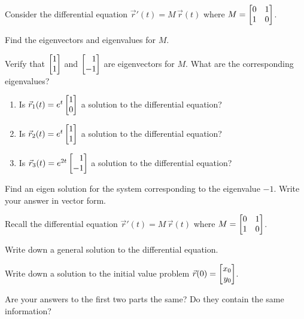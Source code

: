 \documentclass{workbook}
\begin{document}
\begin{slide}
	\question
	Consider the differential equation $\vec r'(t) = M\,\vec r(t)$ where $M=\mat{0&1\\1&0}$.

	\begin{parts}
		\item Find the eigenvectors and eigenvalues for $M$.
		\item Verify that $\mat{1\\1}$ and $\mat{1\\-1}$ are eigenvectors for $M$. What are the
		corresponding eigenvalues?
		\item 
		\begin{enumerate}
			\item Is $\vec r_1(t) =e^t \mat{1\\0}$ a solution to the differential equation?
			\item Is $\vec r_2(t) =e^t \mat{1\\1}$ a solution to the differential equation?
			\item Is $\vec r_3(t) =e^{2t} \mat{1\\-1}$ a solution to the differential equation?
		\end{enumerate}

		\item Find an eigen solution for the system corresponding to the eigenvalue $-1$. Write your answer
		in vector form.
	\end{parts}
\end{slide}

\begin{slide}
	\question
	Recall the differential equation $\vec r'(t) = M\,\vec r(t)$ where $M=\mat{0&1\\1&0}$.

	\begin{parts}
		\item Write down a general solution to the differential equation.
		\item Write down a solution to the initial value problem $\vec r(0)=\mat{x_0\\y_0}$.
		\item Are your answers to the first two parts the same? Do they contain the same information?
	\end{parts}
\end{slide}
\end{document}
